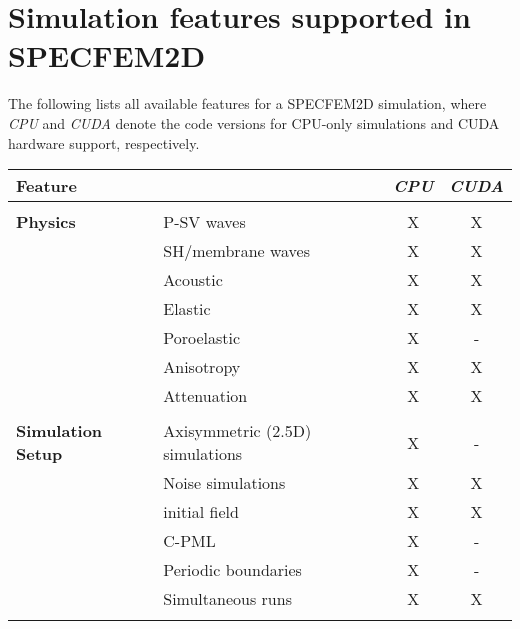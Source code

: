 \chapter*{Simulation features supported in SPECFEM2D}

The following lists all available features for a SPECFEM2D simulation,
where {\it CPU} and {\it CUDA} denote the code versions for CPU-only simulations and
CUDA hardware support, respectively.
%
\begin{table}[htp]
\vspace{-1cm}
\label{table:features}
\begin{center}
\begin{tabular}{ l l c c}
\hline
{\bf Feature}   &   & {\it CPU} & {\it CUDA} \\
\hline
& & & \\
{\bf Physics}   & P-SV waves                & X  & X \\
                & SH/membrane waves         & X  & X \\
                & Acoustic                  & X  & X \\
                & Elastic                   & X  & X \\
                & Poroelastic               & X  & - \\
                & Anisotropy                & X  & X \\
                & Attenuation               & X  & X \\
\hline
& & & \\
{\bf Simulation Setup}  & Axisymmetric (2.5D) simulations   & X  & - \\
                        & Noise simulations                 & X  & X \\
                        & initial field                     & X  & X \\
                        & C-PML                             & X  & - \\
                        & Periodic boundaries               & X  & - \\
                        & Simultaneous runs                 & X  & X \\
\hline
& & & \\

\end{tabular}
\end{center}
\end{table}
